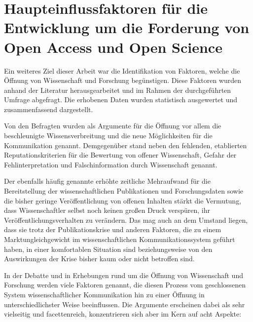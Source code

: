 \section{Haupteinflussfaktoren für die Entwicklung um die Forderung von Open Access und Open Science}

Ein weiteres Ziel dieser Arbeit war die Identifikation von Faktoren, welche die Öffnung von Wissenschaft und Forschung begünstigen. Diese Faktoren wurden anhand der Literatur herausgearbeitet und im Rahmen der durchgeführten Umfrage abgefragt. Die erhobenen Daten wurden statistisch ausgewertet und zusammenfassend dargestellt.

Von den Befragten wurden als Argumente für die Öffnung vor allem die beschleunigte Wissensverbreitung und die neue Möglichkeiten für die Kommunikation genannt. Demgegenüber stand neben den fehlenden, etablierten Reputationskriterien für die Bewertung von offener Wissenschaft, Gefahr der Fehlinterpretation und Falschinformation durch Wissenschaft genannt.

Der ebenfalls häufig genannte erhöhte zeitliche Mehraufwand für die Bereitstellung der wissenschaftlichen Publikationen und Forschungsdaten sowie die bisher geringe Veröffentlichung von offenen Inhalten stärkt die Vermutung, dass Wissenschaftler selbst noch keinen großen Druck verspüren, ihr Veröffentlichungsverhalten zu verändern. Das mag auch an dem Umstand liegen, dass sie trotz der Publikationskrise und anderen Faktoren, die zu einem Marktungleichgewicht im wissenschaftlichen Kommunikationssystem geführt haben, in einer komfortablen Situation sind beziehungsweise von den Auswirkungen der Krise bisher kaum oder nicht betroffen sind.

In der Debatte und in Erhebungen rund um die Öffnung von Wissenschaft und Forschung werden viele Faktoren genannt, die diesen Prozess vom geschlossenen System wissenschaftlicher Kommunikation hin zu einer Öffnung in unterschiedlichster Weise beeinflussen. Die Argumente erscheinen dabei als sehr vielseitig und facettenreich, konzentrieren sich aber im Kern auf acht Aspekte:

